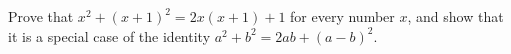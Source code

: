 Prove that $x^2+(x+1)^2=2x(x+1)+1$ for every number $x$, and show that it is a special case of the identity $a^2+b^2=2ab+(a-b)^2$.
